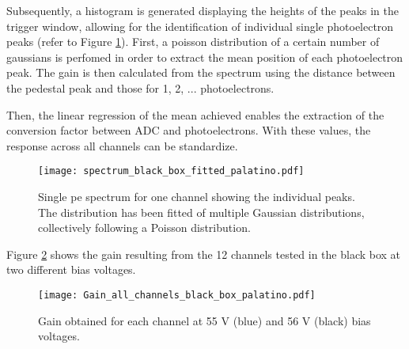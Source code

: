 \documentclass[11pt,a4paper,english,oneside, pdf]{article}
\begin{document}
	Subsequently, a histogram is generated displaying the heights of the peaks in the trigger window, allowing for the identification of individual single photoelectron peaks (refer to Figure \ref{fig:spectrum_black_box_fitted}). First, a poisson distribution of a certain number of gaussians is perfomed in order to extract the mean position of each photoelectron peak. The gain is then calculated from the spectrum using the distance between the pedestal peak and those for 1, 2, ...  photoelectrons.
	
	
	
	Then, the linear regression of the mean achieved enables the extraction of the conversion factor between ADC and photoelectrons. With these values, the response across all channels can be standardize.
	
	\begin{figure}[!h]
		\begin{center}
			\texttt{[image: spectrum\_black\_box\_fitted\_palatino.pdf]}
			\caption{Single pe spectrum for one channel showing the individual peaks. The distribution has been fitted of multiple Gaussian distributions, collectively following a Poisson distribution.}
			\label{fig:spectrum_black_box_fitted}
		\end{center}
	\end{figure}
	
	Figure \ref{fig:Gain_all_channels_black_box} shows the gain resulting from the 12 channels tested in the black box at two different bias voltages.

	\begin{figure}[!h]
		\begin{center}
			\texttt{[image: Gain\_all\_channels\_black\_box\_palatino.pdf]}
			\caption{Gain obtained for each channel at 55 V (blue) and 56 V (black) bias voltages.}
			\label{fig:Gain_all_channels_black_box}
		\end{center}
	\end{figure}
	

	
\end{document}
